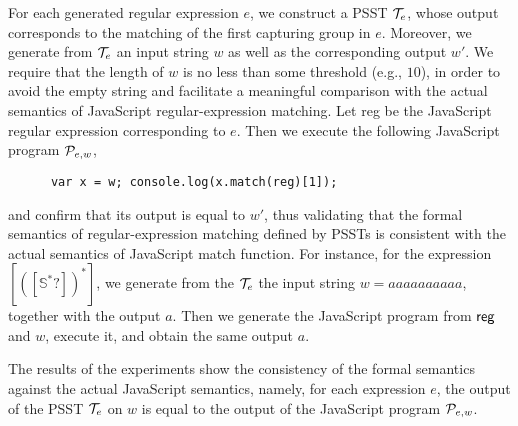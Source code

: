 For each generated regular expression $e$, we construct a PSST $\mathcal{T}_e$, whose output corresponds to the matching of the first capturing group in $e$.  Moreover, we generate from $\mathcal{T}_e$ an input string $w$ as well as the corresponding output $w'$. We require that the length of $w$ is no less than some threshold (e.g., $10$), in order to avoid the empty string and facilitate a  meaningful comparison with the actual semantics of JavaScript regular-expression matching. 
Let {\sf reg} be the JavaScript regular expression corresponding to $e$. Then we execute the following JavaScript program $\mathcal{P}_{e,w}$,
\begin{center}
{
\small
\begin{verbatim}
      var x = w; console.log(x.match(reg)[1]);
\end{verbatim}
}
\end{center}
and confirm that its output is equal to $w'$, thus validating that the formal semantics of  regular-expression matching defined by PSSTs is consistent with the actual semantics of JavaScript {\sf match} function. For instance, for the {\regexp} expression $[([\mathbb{S}^*?])^{*}]$, we generate from the $\mathcal{T}_e$ the input string $w= aaaaaaaaaa$, together with the output $a$. Then we generate  the JavaScript program from ${\sf reg}$ and $w$, execute it, and obtain the same output $a$.

The results of the experiments show the consistency of the formal semantics against the actual JavaScript semantics, namely, for each {\regexp} expression $e$, the output of the PSST $\mathcal{T}_e$ on $w$ is equal to the output of the JavaScript program $\mathcal{P}_{e,w}$.